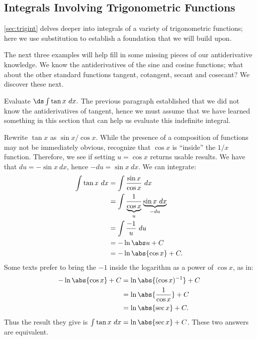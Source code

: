 \subsection{Integrals Involving Trigonometric Functions}

\autoref{sec:trigint} delves deeper into integrals of a variety of trigonometric functions; here we use substitution to establish a foundation that we will build upon. 

The next three examples will help fill in some missing pieces of our antiderivative knowledge. We know the antiderivatives of the sine and cosine functions; what about the other standard functions tangent, cotangent, secant and cosecant? We discover these next.

\begin{example}\label{ex_sub6}
Evaluate $\ds \int \tan x\ dx.$
\solution
The previous paragraph established that we did not know the antiderivatives of tangent, hence we must assume that we have learned something in this section that  can help us evaluate this indefinite integral. 

Rewrite $\tan x$ as $\sin x/\cos x$. While the presence of a composition of functions may not be immediately obvious, recognize that $\cos x$ is ``inside'' the $1/x$ function. Therefore, we see if setting $u = \cos x$ returns usable results. We have that $du = -\sin x\ dx$, hence $-du = \sin x\ dx$. We can integrate:
\begin{align*}
	\int \tan x \ dx
	&= \int \frac{\sin x}{\cos x}\ dx \\
	&= \int \frac1{\underbrace{\cos x}_u}\underbrace{\sin x\ dx}_{-du} \\
	&= \int \frac {-1}u \ du\\
	&= -\ln \abs u + C \\
	&= -\ln \abs{\cos x} + C.
\end{align*}
Some texts prefer to bring the $-1$ inside the logarithm as a power of $\cos x$, as in:
\begin{align*}
	-\ln\abs{\cos x} + C
	&= \ln\abs{(\cos x)^{-1}} + C\\
	&= \ln \abs{\frac{1}{\cos x}} + C\\
	&= \ln \abs{\sec x} + C.
\end{align*}
Thus the result they give is $\int \tan x \ dx = \ln\abs{\sec x}+C$. These two answers are equivalent.
\end{example}

